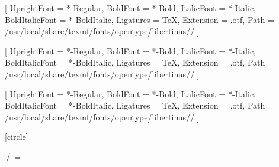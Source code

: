 \def\cvec{{\skew0\mathbf{c}}}

\def\Xbar{\overline{X}}




\usepackage{fontspec}

\def\installpath{/usr/local/share/texmf/fonts/opentype/libertinus/}
\setmainfont{LibertinusSerif}[
UprightFont    = *-Regular,
BoldFont       = *-Bold,
ItalicFont     = *-Italic,
BoldItalicFont = *-BoldItalic,
Ligatures      = TeX,
Extension      = .otf,
Path           = \installpath/
]

\setsansfont{LibertinusSerif}[
UprightFont    = *-Regular,
BoldFont       = *-Bold,
ItalicFont     = *-Italic,
BoldItalicFont = *-BoldItalic,
Ligatures      = TeX,
Extension      = .otf,
Path           = \installpath/
]


\setmonofont{LibertinusSerif}[
UprightFont    = *-Regular,
BoldFont       = *-Bold,
ItalicFont     = *-Italic,
BoldItalicFont = *-BoldItalic,
Ligatures      = TeX,
Extension      = .otf,
Path           = \installpath/
]



[circle]





\beamertemplatenavigationsymbolsempty %

{ %
	\hspace{1em}\insertsectionhead%
	\hfill%
	\insertframenumber\,/\,\hyperlinkappendixstart{\insertmainframenumber}
	\ifnum \thepage = \else{\phantom{\small .}}\fi
	\hspace{1em}
	\vskip2pt%
}

\newtheorem{proposition}[theorem]{Proposition}
\newtheorem{exercise}[theorem]{Exercise}

